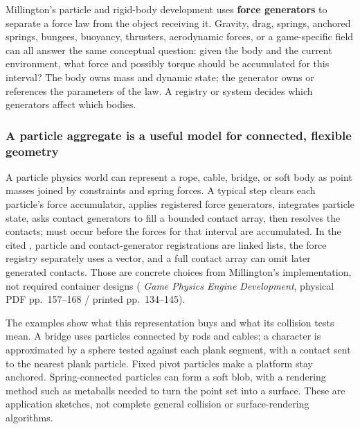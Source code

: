 Millington's particle and rigid-body development uses \textbf{force generators} to separate a force law from the object receiving it. Gravity, drag, springs, anchored springs, bungees, buoyancy, thrusters, aerodynamic forces, or a game-specific field can all answer the same conceptual question: given the body and the current environment, what force and possibly torque should be accumulated for this interval? The body owns mass and dynamic state; the generator owns or references the parameters of the law. A registry or system decides which generators affect which bodies.

\subsubsection{A particle aggregate is a useful model for connected, flexible geometry}\label{06-engine-ii-ch034-a-particle-aggregate-is-a-useful-model-for-connected-flexible-geometry}

\hypertarget{06-engine-ii-ch034-a-particle-aggregate-is-a-useful-model-for-connected-flexible-geometry}{}

A particle physics world can represent a rope, cable, bridge, or soft body as point masses joined by constraints and spring forces. A typical step clears each particle's force accumulator, applies registered force generators, integrates particle state, asks contact generators to fill a bounded contact array, then resolves the contacts;  must occur before the forces for that interval are accumulated. In the cited , particle and contact-generator registrations are linked lists, the force registry separately uses a vector, and a full contact array can omit later generated contacts. Those are concrete choices from Millington's implementation, not required container designs ( \emph{Game Physics Engine Development}, physical PDF pp.~157--168 / printed pp.~134--145).

The examples show what this representation buys and what its collision tests mean. A bridge uses particles connected by rods and cables; a character is approximated by a sphere tested against each plank segment, with a contact sent to the nearest plank particle. Fixed pivot particles make a platform stay anchored. Spring-connected particles can form a soft blob, with a rendering method such as metaballs needed to turn the point set into a surface. These are application sketches, not complete general collision or surface-rendering algorithms.

